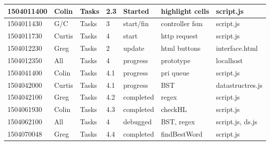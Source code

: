 \documentclass[10pt, oneside]{article}
\begin{document}
\begin{tabular}{|p{1.8cm}|p{1.75cm}|p{1.25cm}|p{0.8cm}|p{1.6cm}|p{3cm}|p{2.8cm}|}
	\hline
	1504011400 & Colin & Tasks & 2.3 & Started & highlight cells & script.js \\
	\hline
	1504011430 & G/C & Tasks & 3 & start/fin & controller fsm & script.js \\
	\hline
	1504011730 & Curtis & Tasks & 4 & start & http request & script.js \\
	\hline
	1504012230 & Greg & Tasks & 2 & update & html buttons & interface.html \\
	\hline 
	1504012350 & All & Tasks & 4 & progress & prototype & localhost \\
	\hline 
	1504041400 & Colin & Tasks & 4.1 & progress & pri queue & script.js \\
	\hline
	1504042000 & Curtis & Tasks & 4.1 & progress & BST & datastructres.js \\
	\hline
	1504042100 & Greg & Tasks & 4.2 & completed & regex & script.js \\
	\hline
	1504061930 & Colin & Tasks & 4.3 & completed & checkHL & script.js \\
	\hline
	1504062100 & All & Tasks & 4 & debugged & BST, regex & script.js, ds.js \\
	\hline
	1504070048 & Greg & Tasks & 4.4 & completed & findBestWord & script.js \\
	\hline
	
	
	
\end{tabular}
\end{document}
